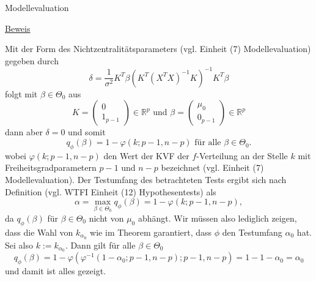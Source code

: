 \documentclass[
  8pt,
  ignorenonframetext,
]{beamer}
\begin{document}
\begin{frame}{Modellevaluation}
\protect\hypertarget{modellevaluation-17}{}
\footnotesize

\underline{Beweis}

Mit der Form des Nichtzentralitätsparameters (vgl. Einheit (7)
Modellevaluation) gegeben durch \begin{equation}
\delta = \frac{1}{\sigma^2}K^T\beta\left(K^T(X^TX)^{-1}K\right)^{-1}K^T\beta
\end{equation} folgt mit \(\beta \in \Theta_0\) aus \begin{equation}
K = \begin{pmatrix} 0 \\ 1_{p-1} \end{pmatrix} \in \mathbb{R}^p \mbox{ und } \beta = \begin{pmatrix} \mu_0 \\ 0_{p-1} \end{pmatrix} \in \mathbb{R}^p 
\end{equation} dann aber \(\delta = 0\) und somit \begin{equation}
q_\phi(\beta) = 1 - \varphi(k;p-1,n-p) \mbox{ für alle } \beta \in \Theta_0.
\end{equation} wobei \(\varphi(k;p-1,n-p)\) den Wert der KVF der
\(f\)-Verteilung an der Stelle \(k\) mit Freiheitsgradparametern \(p-1\)
und \(n-p\) bezeichnet (vgl. Einheit (7) Modellevaluation). Der
Testumfang des betrachteten Tests ergibt sich nach Definition (vgl. WTFI
Einheit (12) Hypothesentests) als \begin{equation}
\alpha = \max_{{\beta \in \Theta_0}} q_{\phi}(\beta) = 1 - \varphi(k;p-1,n-p),
\end{equation} da \(q_{\phi}(\beta)\) für \(\beta \in \Theta_0\) nicht
von \(\mu_0\) abhängt. Wir müssen also lediglich zeigen, dass die Wahl
von \(k_{\alpha_0}\) wie im Theorem garantiert, dass \(\phi\) den
Testumfang \(\alpha_0\) hat. Sei also \(k := k_{\alpha_0}\). Dann gilt
für alle \(\beta \in \Theta_0\) \begin{equation}
q_\phi(\beta) 
= 1 - \varphi( \varphi^{-1}(1-\alpha_0;p-1, n-p);p-1,n-p)
= 1 - 1-\alpha_0
= \alpha_0
\end{equation} und damit ist alles gezeigt.
\end{frame}
\end{document}
